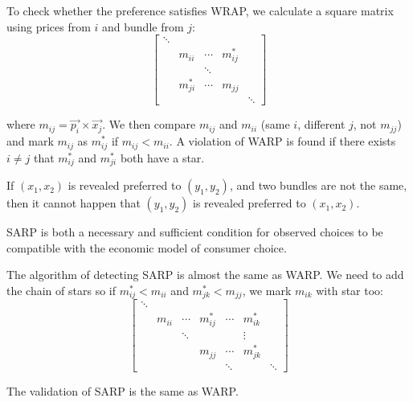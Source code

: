 To check whether the preference satisfies WRAP, we calculate a square matrix using prices from $i$ and bundle from $j$:
\begin{equation}
    \begin{bmatrix}
			\ddots &   &   &  &   \\
			 & m_{ii} & \cdots & m_{ij}^* &   \\
			 & & \ddots & & \\
			 & m_{ji}^* & \cdots & m_{jj} & \\
			&&&& \ddots
		\end{bmatrix}
\end{equation}

where $m_{ij} =\overrightarrow{p_i} \times \overrightarrow{x_j}$. We then compare $m_{ij}$ and $m_{ii}$ (same $i$, different $j$, not $m_{jj}$) and mark $m_{ij}$ as $m_{ij}^*$ if $m_{ij} < m_{ii}$. A violation of WARP is found if there exists $i \neq j$ that $m_{ij}^*$ and $m_{ji}^*$ both have a star.

\begin{theorem}
    If $(x_1,x_2)$ is revealed preferred to $(y_1,y_2)$, and two bundles are not the same, then it cannot happen that $(y_1,y_2)$ is revealed preferred to $(x_1,x_2)$.
\end{theorem}

SARP is both a necessary and sufficient condition for observed choices to be compatible with the economic model of consumer choice.

The algorithm of detecting SARP is almost the same as WARP. We need to add the chain of stars so if $m_{ij}^* < m_{ii}$ and $m_{jk}^* < m_{jj}$, we mark $m_{ik}$ with star too:
\begin{equation}
    \begin{bmatrix}
			\ddots &   &   &  &  & & \\
			 & m_{ii} & \cdots & m_{ij}^* & \cdots & m_{ik}^* &  \\
			 &        & \ddots &          &        & \vdots & \\
			 &        &        & m_{jj}   & \cdots & m_{jk}^* & \\
			 &        &        &          & \ddots &        & \ddots
		\end{bmatrix}
\end{equation}


The validation of SARP is the same as WARP.


